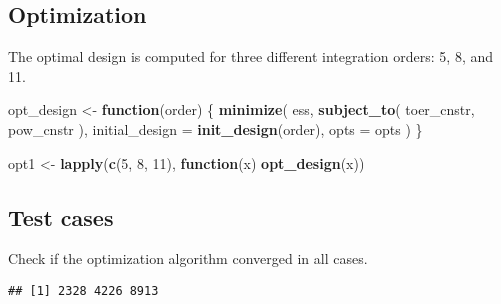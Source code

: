 \documentclass[]{book}
\newenvironment{Shaded}{\begin{snugshade}}{\end{snugshade}}
\newcommand{\ControlFlowTok}[1]{\textcolor[rgb]{0.13,0.29,0.53}{\textbf{#1}}}
\newcommand{\DataTypeTok}[1]{\textcolor[rgb]{0.13,0.29,0.53}{#1}}
\newcommand{\DecValTok}[1]{\textcolor[rgb]{0.00,0.00,0.81}{#1}}
\newcommand{\KeywordTok}[1]{\textcolor[rgb]{0.13,0.29,0.53}{\textbf{#1}}}
\newcommand{\NormalTok}[1]{#1}
\newcommand{\OperatorTok}[1]{\textcolor[rgb]{0.81,0.36,0.00}{\textbf{#1}}}
\newcommand{\StringTok}[1]{\textcolor[rgb]{0.31,0.60,0.02}{#1}}
\begin{document}
\hypertarget{optimization-9}{%
\subsection{Optimization}\label{optimization-9}}

The optimal design is computed for three different integration orders: 5, 8,
and 11.

\begin{Shaded}
\begin{Highlighting}[]
\NormalTok{opt_design <-}\StringTok{ }\ControlFlowTok{function}\NormalTok{(order) \{}
    \KeywordTok{minimize}\NormalTok{(}
\NormalTok{        ess,}
        \KeywordTok{subject_to}\NormalTok{(}
\NormalTok{            toer_cnstr,}
\NormalTok{            pow_cnstr}
\NormalTok{        ),}
        \DataTypeTok{initial_design =} \KeywordTok{init_design}\NormalTok{(order),}
        \DataTypeTok{opts =}\NormalTok{ opts}
\NormalTok{    )}
\NormalTok{\}}

\NormalTok{opt1 <-}\StringTok{ }\KeywordTok{lapply}\NormalTok{(}\KeywordTok{c}\NormalTok{(}\DecValTok{5}\NormalTok{, }\DecValTok{8}\NormalTok{, }\DecValTok{11}\NormalTok{), }\ControlFlowTok{function}\NormalTok{(x) }\KeywordTok{opt_design}\NormalTok{(x))}
\end{Highlighting}
\end{Shaded}

\hypertarget{test-cases-10}{%
\subsection{Test cases}\label{test-cases-10}}

Check if the optimization algorithm converged in all cases.

\begin{Shaded}
\end{Shaded}

\begin{verbatim}
## [1] 2328 4226 8913
\end{verbatim}

\begin{Shaded}
\end{Shaded}
\end{document}
